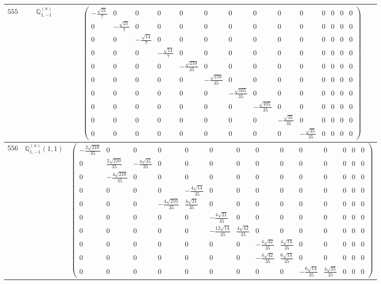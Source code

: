\documentclass[fleqn,8pt,landscape]{jsarticle}
\begin{document}
\begin{center}
\begin{longtable}{ccc}
$ 555 $ & $ \mathbb{Q}_{1,-1}^{(a)} $ & $ \begin{pmatrix} - \frac{\sqrt{21}}{7} & 0 & 0 & 0 & 0 & 0 & 0 & 0 & 0 & 0 & 0 & 0 & 0 & 0 \\ 0 & - \frac{\sqrt{21}}{7} & 0 & 0 & 0 & 0 & 0 & 0 & 0 & 0 & 0 & 0 & 0 & 0 \\ 0 & 0 & - \frac{\sqrt{14}}{7} & 0 & 0 & 0 & 0 & 0 & 0 & 0 & 0 & 0 & 0 & 0 \\ 0 & 0 & 0 & - \frac{\sqrt{14}}{7} & 0 & 0 & 0 & 0 & 0 & 0 & 0 & 0 & 0 & 0 \\ 0 & 0 & 0 & 0 & - \frac{\sqrt{210}}{35} & 0 & 0 & 0 & 0 & 0 & 0 & 0 & 0 & 0 \\ 0 & 0 & 0 & 0 & 0 & - \frac{\sqrt{210}}{35} & 0 & 0 & 0 & 0 & 0 & 0 & 0 & 0 \\ 0 & 0 & 0 & 0 & 0 & 0 & - \frac{\sqrt{105}}{35} & 0 & 0 & 0 & 0 & 0 & 0 & 0 \\ 0 & 0 & 0 & 0 & 0 & 0 & 0 & - \frac{\sqrt{105}}{35} & 0 & 0 & 0 & 0 & 0 & 0 \\ 0 & 0 & 0 & 0 & 0 & 0 & 0 & 0 & - \frac{\sqrt{35}}{35} & 0 & 0 & 0 & 0 & 0 \\ 0 & 0 & 0 & 0 & 0 & 0 & 0 & 0 & 0 & - \frac{\sqrt{35}}{35} & 0 & 0 & 0 & 0 \end{pmatrix} $ \\ \hline
$ 556 $ & $ \mathbb{Q}_{1,-1}^{(a)}(1,1) $ & $ \begin{pmatrix} - \frac{2 \sqrt{210}}{35} & 0 & 0 & 0 & 0 & 0 & 0 & 0 & 0 & 0 & 0 & 0 & 0 & 0 \\ 0 & \frac{2 \sqrt{210}}{35} & - \frac{4 \sqrt{35}}{35} & 0 & 0 & 0 & 0 & 0 & 0 & 0 & 0 & 0 & 0 & 0 \\ 0 & - \frac{4 \sqrt{210}}{35} & 0 & 0 & 0 & 0 & 0 & 0 & 0 & 0 & 0 & 0 & 0 & 0 \\ 0 & 0 & 0 & 0 & - \frac{4 \sqrt{14}}{35} & 0 & 0 & 0 & 0 & 0 & 0 & 0 & 0 & 0 \\ 0 & 0 & 0 & - \frac{4 \sqrt{210}}{35} & \frac{4 \sqrt{21}}{35} & 0 & 0 & 0 & 0 & 0 & 0 & 0 & 0 & 0 \\ 0 & 0 & 0 & 0 & 0 & - \frac{4 \sqrt{21}}{35} & 0 & 0 & 0 & 0 & 0 & 0 & 0 & 0 \\ 0 & 0 & 0 & 0 & 0 & - \frac{12 \sqrt{14}}{35} & \frac{4 \sqrt{42}}{35} & 0 & 0 & 0 & 0 & 0 & 0 & 0 \\ 0 & 0 & 0 & 0 & 0 & 0 & 0 & - \frac{4 \sqrt{42}}{35} & \frac{4 \sqrt{14}}{35} & 0 & 0 & 0 & 0 & 0 \\ 0 & 0 & 0 & 0 & 0 & 0 & 0 & - \frac{4 \sqrt{42}}{35} & \frac{6 \sqrt{14}}{35} & 0 & 0 & 0 & 0 & 0 \\ 0 & 0 & 0 & 0 & 0 & 0 & 0 & 0 & 0 & - \frac{6 \sqrt{14}}{35} & \frac{4 \sqrt{35}}{35} & 0 & 0 & 0 \end{pmatrix} $ \\ \hline

\end{longtable}
\end{center}
\end{document}
